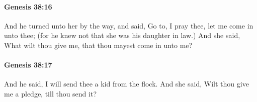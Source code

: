 		\paragraph{Genesis 38:16} %
			\label{GENESIS-38-16}

			And he turned unto her by the way, and said, Go to, I pray thee, let me come in unto thee; (for he knew not that she was his daughter in law.) And she said, What wilt thou give me, that thou mayest come in unto me?


		\paragraph{Genesis 38:17} %
			\label{GENESIS-38-17}

			And he said, I will send thee a kid from the flock. And she said, Wilt thou give me a pledge, till thou send it?


